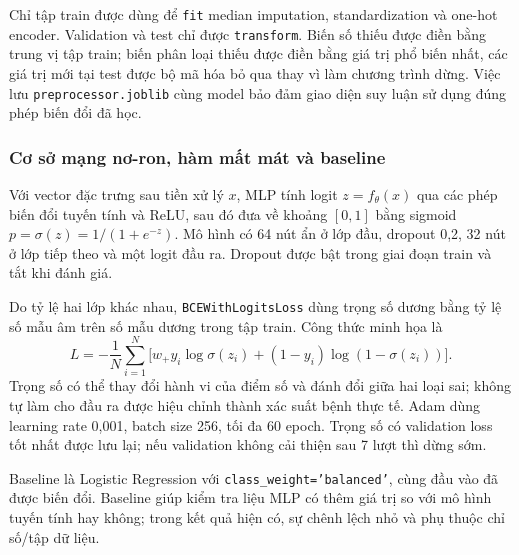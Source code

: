 Chỉ tập train được dùng để \texttt{fit} median imputation, standardization và one-hot encoder. Validation và test chỉ được \texttt{transform}. Biến số thiếu được điền bằng trung vị tập train; biến phân loại thiếu được điền bằng giá trị phổ biến nhất, các giá trị mới tại test được bộ mã hóa bỏ qua thay vì làm chương trình dừng. Việc lưu \texttt{preprocessor.joblib} cùng model bảo đảm giao diện suy luận sử dụng đúng phép biến đổi đã học.
\subsubsection{Cơ sở mạng nơ-ron, hàm mất mát và baseline}
Với vector đặc trưng sau tiền xử lý $x$, MLP tính logit $z=f_\theta(x)$ qua các phép biến đổi tuyến tính và ReLU, sau đó đưa về khoảng $[0,1]$ bằng sigmoid $p=\sigma(z)=1/(1+e^{-z})$. Mô hình có 64 nút ẩn ở lớp đầu, dropout 0,2, 32 nút ở lớp tiếp theo và một logit đầu ra. Dropout được bật trong giai đoạn train và tắt khi đánh giá.

Do tỷ lệ hai lớp khác nhau, \texttt{BCEWithLogitsLoss} dùng trọng số dương bằng tỷ lệ số mẫu âm trên số mẫu dương trong tập train. Công thức minh họa là
\[
 L=-\frac1N\sum_{i=1}^{N}\big[w_+y_i\log \sigma(z_i)+(1-y_i)\log(1-\sigma(z_i))\big].
\]
Trọng số có thể thay đổi hành vi của điểm số và đánh đổi giữa hai loại sai; không tự làm cho đầu ra được hiệu chỉnh thành xác suất bệnh thực tế. Adam dùng learning rate 0,001, batch size 256, tối đa 60 epoch. Trọng số có validation loss tốt nhất được lưu lại; nếu validation không cải thiện sau 7 lượt thì dừng sớm.

Baseline là Logistic Regression với \texttt{class\_weight='balanced'}, cùng đầu vào đã được biến đổi. Baseline giúp kiểm tra liệu MLP có thêm giá trị so với mô hình tuyến tính hay không; trong kết quả hiện có, sự chênh lệch nhỏ và phụ thuộc chỉ số/tập dữ liệu.
